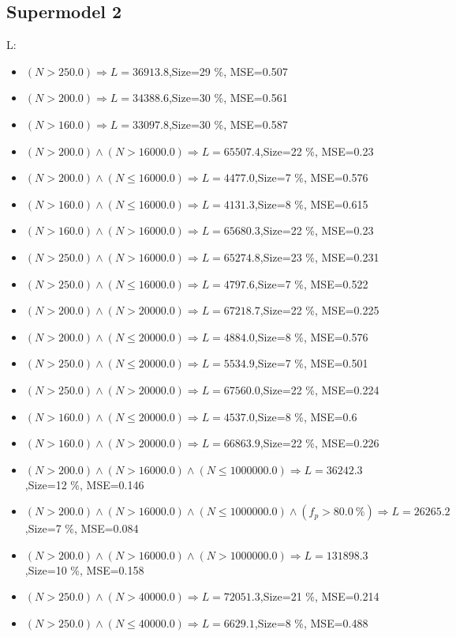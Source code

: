 \documentclass[numbered]{CSL}
\begin{document}
\subsection{Supermodel 2}
L:
\begin{itemize}
\item $(N > 250.0) \Rightarrow L = 36913.8$,\hfill Size=29 \%, MSE=0.507
\item $(N > 200.0) \Rightarrow L = 34388.6$,\hfill Size=30 \%, MSE=0.561
\item $(N > 160.0) \Rightarrow L = 33097.8$,\hfill Size=30 \%, MSE=0.587
\item $(N > 200.0) \land (N > 16000.0) \Rightarrow L = 65507.4$,\hfill Size=22 \%, MSE=0.23
\item $(N > 200.0) \land (N \leq 16000.0) \Rightarrow L = 4477.0$,\hfill Size=7 \%, MSE=0.576
\item $(N > 160.0) \land (N \leq 16000.0) \Rightarrow L = 4131.3$,\hfill Size=8 \%, MSE=0.615
\item $(N > 160.0) \land (N > 16000.0) \Rightarrow L = 65680.3$,\hfill Size=22 \%, MSE=0.23
\item $(N > 250.0) \land (N > 16000.0) \Rightarrow L = 65274.8$,\hfill Size=23 \%, MSE=0.231
\item $(N > 250.0) \land (N \leq 16000.0) \Rightarrow L = 4797.6$,\hfill Size=7 \%, MSE=0.522
\item $(N > 200.0) \land (N > 20000.0) \Rightarrow L = 67218.7$,\hfill Size=22 \%, MSE=0.225
\item $(N > 200.0) \land (N \leq 20000.0) \Rightarrow L = 4884.0$,\hfill Size=8 \%, MSE=0.576
\item $(N > 250.0) \land (N \leq 20000.0) \Rightarrow L = 5534.9$,\hfill Size=7 \%, MSE=0.501
\item $(N > 250.0) \land (N > 20000.0) \Rightarrow L = 67560.0$,\hfill Size=22 \%, MSE=0.224
\item $(N > 160.0) \land (N \leq 20000.0) \Rightarrow L = 4537.0$,\hfill Size=8 \%, MSE=0.6
\item $(N > 160.0) \land (N > 20000.0) \Rightarrow L = 66863.9$,\hfill Size=22 \%, MSE=0.226
\item $(N > 200.0) \land (N > 16000.0) \land (N \leq 1000000.0) \Rightarrow L = 36242.3$,\hfill Size=12 \%, MSE=0.146
\item $(N > 200.0) \land (N > 16000.0) \land (N \leq 1000000.0) \land (f_p > 80.0~\%) \Rightarrow L = 26265.2$,\hfill Size=7 \%, MSE=0.084
\item $(N > 200.0) \land (N > 16000.0) \land (N > 1000000.0) \Rightarrow L = 131898.3$,\hfill Size=10 \%, MSE=0.158
\item $(N > 250.0) \land (N > 40000.0) \Rightarrow L = 72051.3$,\hfill Size=21 \%, MSE=0.214
\item $(N > 250.0) \land (N \leq 40000.0) \Rightarrow L = 6629.1$,\hfill Size=8 \%, MSE=0.488
\end{itemize}
\end{document}
